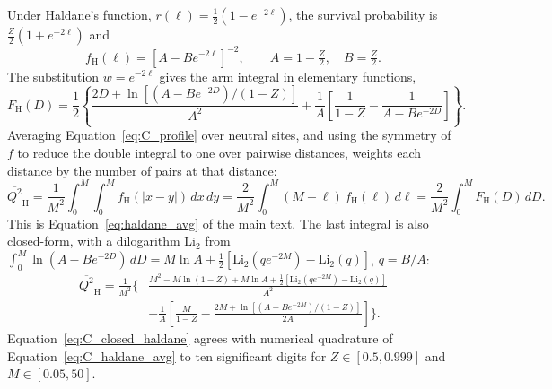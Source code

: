 \documentclass[12pt]{article}
\begin{document}
Under Haldane's function, $r(\ell) = \frac{1}{2}(1-e^{-2\ell})$, the survival probability is $\frac{Z}{2}(1+e^{-2\ell})$ and
\begin{equation}
    f_\text{H}(\ell) = \left[A - B e^{-2\ell}\right]^{-2}, \qquad A = 1 - \tfrac{Z}{2}, \quad B = \tfrac{Z}{2}.
\end{equation}
The substitution $w = e^{-2\ell}$ gives the arm integral in elementary functions,
\begin{equation}
    F_\text{H}(D) = \frac{1}{2}\left\{\frac{2D + \ln\!\left[(A - Be^{-2D})/(1-Z)\right]}{A^2} + \frac{1}{A}\left[\frac{1}{1-Z} - \frac{1}{A - Be^{-2D}}\right]\right\}.
\label{eq:C_arm}
\end{equation}
Averaging Equation~\eqref{eq:C_profile} over neutral sites, and using the symmetry of $f$ to reduce the double integral to one over pairwise distances, weights each distance by the number of pairs at that distance:
\begin{equation}
    \overline{Q^2}_\text{H} = \frac{1}{M^2}\int_0^M\!\!\int_0^M f_\text{H}(\vert x-y\vert)\,dx\,dy = \frac{2}{M^2}\int_0^M (M-\ell)\,f_\text{H}(\ell)\,d\ell = \frac{2}{M^2}\int_0^M F_\text{H}(D)\,dD.
\label{eq:C_haldane_avg}
\end{equation}
This is Equation~\eqref{eq:haldane_avg} of the main text. The last integral is also closed-form, with a dilogarithm $\mathrm{Li}_2$ from $\int_0^M \ln(A - Be^{-2D})\,dD = M\ln A + \frac{1}{2}\left[\mathrm{Li}_2(q e^{-2M}) - \mathrm{Li}_2(q)\right]$, $q = B/A$:
\begin{equation}
\begin{split}
    \overline{Q^2}_\text{H} = \frac{1}{M^2}\Bigg\{ &\frac{M^2 - M\ln(1-Z) + M\ln A + \tfrac{1}{2}\left[\mathrm{Li}_2(qe^{-2M}) - \mathrm{Li}_2(q)\right]}{A^2} \\
    &+ \frac{1}{A}\left[\frac{M}{1-Z} - \frac{2M + \ln\!\left[(A-Be^{-2M})/(1-Z)\right]}{2A}\right]\Bigg\}.
\end{split}
\label{eq:C_closed_haldane}
\end{equation}
Equation~\eqref{eq:C_closed_haldane} agrees with numerical quadrature of Equation~\eqref{eq:C_haldane_avg} to ten significant digits for $Z \in [0.5, 0.999]$ and $M \in [0.05, 50]$.
\end{document}

